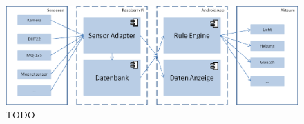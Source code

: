 \begin{figure}
  \centering
    \includegraphics{images/Konzept_allgemein.png}
  \caption{TODO}
  \label{fig:M1}
\end{figure}